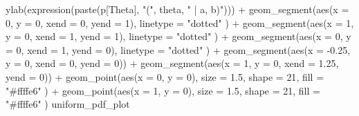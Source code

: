 \documentclass[
  11pt,
]{krantz}
\makeatletter
\newenvironment{Shaded}{\begin{snugshade}}{\end{snugshade}}
\newcommand{\AttributeTok}[1]{\textcolor[rgb]{0.61,0.61,0.61}{#1}}
\newcommand{\DecValTok}[1]{\textcolor[rgb]{0.06,0.06,0.06}{#1}}
\newcommand{\FloatTok}[1]{\textcolor[rgb]{0.06,0.06,0.06}{#1}}
\newcommand{\FunctionTok}[1]{\textcolor[rgb]{0,0,0}{#1}}
\newcommand{\NormalTok}[1]{#1}
\newcommand{\SpecialCharTok}[1]{\textcolor[rgb]{0,0,0}{#1}}
\newcommand{\StringTok}[1]{\textcolor[rgb]{0.5,0.5,0.5}{#1}}
\newenvironment{kframe}{%
\medskip{}
\setlength{\fboxsep}{.8em}
 \def\at@end@of@kframe{}%
 \ifinner\ifhmode%
  \def\at@end@of@kframe{\end{minipage}}%
  \begin{minipage}{\columnwidth}%
 \fi\fi%
 \def\FrameCommand##1{\hskip\@totalleftmargin \hskip-\fboxsep
 \colorbox{shadecolor}{##1}\hskip-\fboxsep
     \hskip-\linewidth \hskip-\@totalleftmargin \hskip\columnwidth}%
 \MakeFramed {\advance\hsize-\width
   \@totalleftmargin\z@ \linewidth\hsize
   \@setminipage}}%
 {\par\unskip\endMakeFramed%
 \at@end@of@kframe}
\renewenvironment{Shaded}{\begin{kframe}}{\end{kframe}}
\theoremstyle{definition}
\theoremstyle{definition}
\theoremstyle{definition}
\theoremstyle{definition}
\theoremstyle{remark}
\makeatother
\begin{document}
\begin{Shaded}
\begin{Highlighting}[]
  \FunctionTok{ylab}\NormalTok{(}\FunctionTok{expression}\NormalTok{(}\FunctionTok{paste}\NormalTok{(p[Theta], }\StringTok{"("}\NormalTok{, theta, }\StringTok{" | a, b)"}\NormalTok{))) }\SpecialCharTok{+}
  \FunctionTok{geom\_segment}\NormalTok{(}\FunctionTok{aes}\NormalTok{(}\AttributeTok{x =} \DecValTok{0}\NormalTok{, }\AttributeTok{y =} \DecValTok{0}\NormalTok{, }\AttributeTok{xend =} \DecValTok{0}\NormalTok{, }\AttributeTok{yend =} \DecValTok{1}\NormalTok{),}
    \AttributeTok{linetype =} \StringTok{"dotted"}
\NormalTok{  ) }\SpecialCharTok{+}
  \FunctionTok{geom\_segment}\NormalTok{(}\FunctionTok{aes}\NormalTok{(}\AttributeTok{x =} \DecValTok{1}\NormalTok{, }\AttributeTok{y =} \DecValTok{0}\NormalTok{, }\AttributeTok{xend =} \DecValTok{1}\NormalTok{, }\AttributeTok{yend =} \DecValTok{1}\NormalTok{),}
    \AttributeTok{linetype =} \StringTok{"dotted"}
\NormalTok{  ) }\SpecialCharTok{+}
  \FunctionTok{geom\_segment}\NormalTok{(}\FunctionTok{aes}\NormalTok{(}\AttributeTok{x =} \DecValTok{0}\NormalTok{, }\AttributeTok{y =} \DecValTok{0}\NormalTok{, }\AttributeTok{xend =} \DecValTok{1}\NormalTok{, }\AttributeTok{yend =} \DecValTok{0}\NormalTok{),}
    \AttributeTok{linetype =} \StringTok{"dotted"}
\NormalTok{  ) }\SpecialCharTok{+}
  \FunctionTok{geom\_segment}\NormalTok{(}\FunctionTok{aes}\NormalTok{(}\AttributeTok{x =} \SpecialCharTok{{-}}\FloatTok{0.25}\NormalTok{, }\AttributeTok{y =} \DecValTok{0}\NormalTok{, }\AttributeTok{xend =} \DecValTok{0}\NormalTok{, }\AttributeTok{yend =} \DecValTok{0}\NormalTok{)) }\SpecialCharTok{+}
  \FunctionTok{geom\_segment}\NormalTok{(}\FunctionTok{aes}\NormalTok{(}\AttributeTok{x =} \DecValTok{1}\NormalTok{, }\AttributeTok{y =} \DecValTok{0}\NormalTok{, }\AttributeTok{xend =} \FloatTok{1.25}\NormalTok{, }\AttributeTok{yend =} \DecValTok{0}\NormalTok{)) }\SpecialCharTok{+}
  \FunctionTok{geom\_point}\NormalTok{(}\FunctionTok{aes}\NormalTok{(}\AttributeTok{x =} \DecValTok{0}\NormalTok{, }\AttributeTok{y =} \DecValTok{0}\NormalTok{),}
    \AttributeTok{size =} \FloatTok{1.5}\NormalTok{, }\AttributeTok{shape =} \DecValTok{21}\NormalTok{,}
    \AttributeTok{fill =} \StringTok{"\#ffffe6"}
\NormalTok{  ) }\SpecialCharTok{+}
  \FunctionTok{geom\_point}\NormalTok{(}\FunctionTok{aes}\NormalTok{(}\AttributeTok{x =} \DecValTok{1}\NormalTok{, }\AttributeTok{y =} \DecValTok{0}\NormalTok{),}
    \AttributeTok{size =} \FloatTok{1.5}\NormalTok{, }\AttributeTok{shape =} \DecValTok{21}\NormalTok{,}
    \AttributeTok{fill =} \StringTok{"\#ffffe6"}
\NormalTok{  )}
\NormalTok{uniform\_pdf\_plot}
\end{Highlighting}
\end{Shaded}
\end{document}
